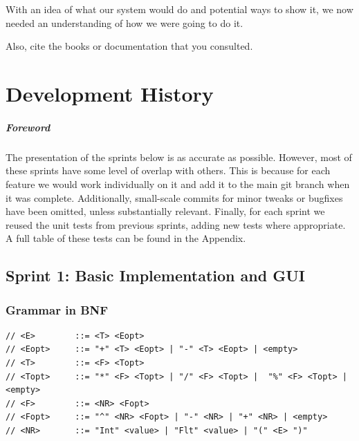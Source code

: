 \documentclass[a4paper, oneside, 11pt]{report}
\begin{document}
    With an idea of what our system would do and potential ways to show it, we now needed an understanding of how we were going to do it.


    Also, cite the books \citep{Nystrom:2021} or documentation \citep{WPF:2023} that you consulted.
    \chapter{Development History}\label{Chap:DevHist}


    \paragraph{Foreword} The presentation of the sprints below is as accurate as possible. However, most of these sprints have some level of overlap with others. This is because for each feature we would work individually on it and add it to the main git branch when it was complete. Additionally, small-scale commits for minor tweaks or bugfixes have been omitted, unless substantially relevant. Finally, for each sprint we reused the unit tests from previous sprints, adding new tests where appropriate. A full table of these tests can be found in the Appendix.


    \section{Sprint 1: Basic Implementation and GUI}
    \subsection{Grammar in BNF}
    \begin{verbatim}
// <E>        ::= <T> <Eopt>
// <Eopt>     ::= "+" <T> <Eopt> | "-" <T> <Eopt> | <empty>
// <T>        ::= <F> <Topt>
// <Topt>     ::= "*" <F> <Topt> | "/" <F> <Topt> |  "%" <F> <Topt> |<empty>
// <F>        ::= <NR> <Fopt>
// <Fopt>     ::= "^" <NR> <Fopt> | "-" <NR> | "+" <NR> | <empty>
// <NR>       ::= "Int" <value> | "Flt" <value> | "(" <E> ")"
    \end{verbatim}
\end{document}
